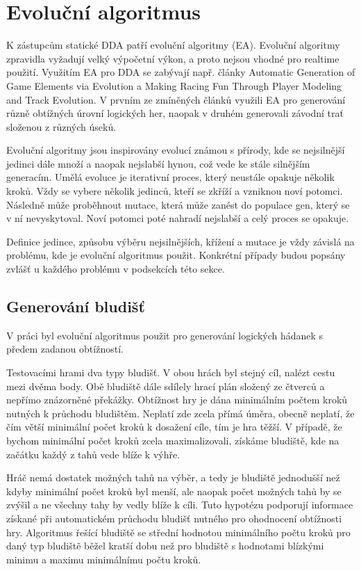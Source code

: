 \section{Evoluční algoritmus} \label{sec:evol}

K zástupcům statické DDA patří evoluční algoritmy (EA). Evoluční algoritmy zpravidla vyžadují velký výpočetní výkon, a proto nejsou vhodné pro realtime použití. Využitím EA pro DDA se zabývají např. články Automatic Generation of Game Elements via Evolution\cite{17Evol} a Making Racing Fun Through Player Modeling
and Track Evolution\cite{EvolTrack}. V prvním ze zmíněných článků využili EA pro generování různě obtížných úrovní logických her, naopak v druhém generovali závodní trať složenou z různých úseků.

Evoluční algoritmy jsou inspirovány evolucí známou s přírody, kde se nejsilnější jedinci dále množí a naopak nejslabší hynou, což vede ke stále silnějším generacím. Umělá evoluce je iterativní proces, který neustále opakuje několik kroků. Vždy se vybere několik jedinců, kteří se zkříží a vzniknou noví potomci. Následně může proběhnout mutace, která může zanést do populace gen, který se v ní nevyskytoval. Noví potomci poté nahradí nejslabší a celý proces se opakuje.

Definice jedince, způsobu výběru nejsilnějších, křížení a mutace je vždy závislá na problému, kde je evoluční algoritmus použit. Konkrétní případy budou popsány zvlášť u každého problému v podsekcích této sekce.

\subsection{Generování bludišť}

V práci \cite{17Evol} byl evoluční algoritmus použit pro generování logických hádanek s předem zadanou obtížností.

Testovacími hrami dva typy bludišť. V obou hrách byl stejný cíl, nalézt cestu mezi dvěma body. Obě bludiště dále sdílely hrací plán složený ze čtverců a nepřímo znázorněné překážky. Obtížnost hry je dána minimálním počtem kroků nutných k průchodu bludištěm. Neplatí zde zcela přímá úměra, obecně neplatí, že čím větší minimální počet kroků k dosažení cíle, tím je hra těžší. V případě, že bychom minimální počet kroků zcela maximalizovali, získáme bludiště, kde na začátku každý z tahů vede blíže k výhře. 

Hráč nemá dostatek možných tahů na výběr, a tedy je bludiště jednodušší než kdyby minimální počet kroků byl menší, ale naopak počet možných tahů by se zvýšil a ne všechny tahy by vedly blíže k cíli. Tuto hypotézu podporují informace získané při automatickém průchodu bludišť nutného pro ohodnocení obtížnosti hry. Algoritmus řešící bludiště se střední hodnotou minimálního počtu kroků pro daný typ bludiště běžel kratší dobu než pro bludiště s hodnotami blízkými minimu a maximu minimálnímu počtu kroků.

